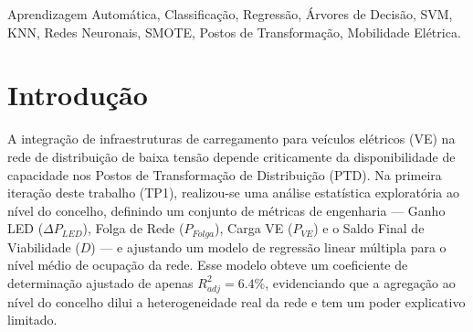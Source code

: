\documentclass[conference]{IEEEtran}
\begin{document}
\begin{abstract}
Este artigo apresenta a segunda iteração de um estudo sobre a relação entre a eficiência energética da Iluminação Pública (IP) e a capacidade da rede de Postos de Transformação de Distribuição (PTD) em Portugal. Enquanto a primeira iteração se centrou numa análise estatística agregada ao nível do concelho, o presente trabalho desce ao nível do PTD individual (cerca de 69\,000 registos), aplicando técnicas de Aprendizagem Automática para prever, por um lado, a folga de potência disponível em cada posto (\texttt{PFolga\_PTD}, problema de regressão) e, por outro, o nível de ocupação da rede (\texttt{utilizRede}, problema de classificação em três classes: baixo, médio e alto). Foram desenvolvidos e comparados modelos de regressão linear simples e múltipla, árvores de decisão/regressão, \textit{Support Vector Machines} (SVM) e redes neuronais, e modelos de classificação por árvore de decisão, SVM, K-vizinhos-mais-próximos (KNN) e redes neuronais, todos avaliados por validação cruzada de 10 \textit{folds}. Discute-se ainda o problema do desequilíbrio das classes da variável \texttt{utilizRede} (51\%/25\%/24\%), as suas causas estruturais e as estratégias de mitigação propostas, nomeadamente a técnica \textit{Synthetic Minority Oversampling Technique} (SMOTE). Os resultados mostram que a Árvore de Decisão (profundidade 7) obtém o melhor desempenho global na classificação (Accuracy $\approx$ 0.699), estatisticamente equivalente ao da rede neuronal, e que a folga de rede ao nível do PTD é dominada pela variável \texttt{Cap\_PTD\_kVA}, enquanto a ocupação da rede é melhor explicada pela capacidade por cliente (\texttt{Cap\_per\_Cliente}). Conclui-se que o impacto da modernização LED na folga de rede ao nível do PTD individual é marginal, reforçando conclusões da primeira iteração do trabalho.
\end{abstract}

\begin{IEEEkeywords}
Aprendizagem Automática, Classificação, Regressão, Árvores de Decisão, SVM, KNN, Redes Neuronais, SMOTE, Postos de Transformação, Mobilidade Elétrica.
\end{IEEEkeywords}

\section{Introdução}

A integração de infraestruturas de carregamento para veículos elétricos (VE) na rede de distribuição de baixa tensão depende criticamente da disponibilidade de capacidade nos Postos de Transformação de Distribuição (PTD). Na primeira iteração deste trabalho (TP1), realizou-se uma análise estatística exploratória ao nível do concelho, definindo um conjunto de métricas de engenharia --- Ganho LED ($\Delta P_{LED}$), Folga de Rede ($P_{Folga}$), Carga VE ($P_{VE}$) e o Saldo Final de Viabilidade ($D$) --- e ajustando um modelo de regressão linear múltipla para o nível médio de ocupação da rede. Esse modelo obteve um coeficiente de determinação ajustado de apenas $R^2_{adj} = 6.4\%$, evidenciando que a agregação ao nível do concelho dilui a heterogeneidade real da rede e tem um poder explicativo limitado.
\end{document}
